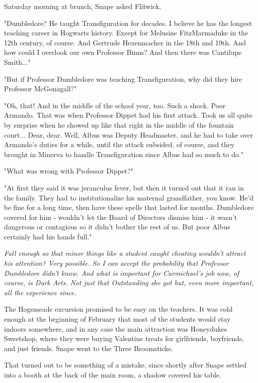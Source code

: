 \documentclass[a4paper,11pt]{article}
\begin{document}
Saturday morning at brunch, Snape asked Flitwick.

"Dumbledore? He taught Transfiguration for decades. I believe he has the longest teaching career in Hogwarts history. Except for Melusine FitzMarmaduke in the 12th century, of course. And Gertrude Hexenmacher in the 18th and 19th. And how could I overlook our own Professor Binns? And then there was Cantilupe Smith..."

"But if Professor Dumbledore was teaching Transfiguration, why did they hire Professor McGonagall?"

"Oh, that! And in the middle of the school year, too. Such a shock. Poor Armando. That was when Professor Dippet had his first attack. Took us all quite by surprise when he showed up like that right in the middle of the fountain court... Dear, dear. Well, Albus was Deputy Headmaster, and he had to take over Armando's duties for a while, until the attack subsided, of course, and they brought in Minerva to handle Transfiguration since Albus had so much to do."

"What was wrong with Professor Dippet?"

"At first they said it was jeranculus fever, but then it turned out that it ran in the family. They had to institutionalize his maternal grandfather, you know. He'd be fine for a long time, then have these spells that lasted for months. Dumbledore covered for him - wouldn't let the Board of Directors dismiss him - it wasn't dangerous or contagious so it didn't bother the rest of us. But poor Albus certainly had his hands full."

\emph{Full enough so that minor things like a student caught cheating wouldn't attract his attention? Very possible. So I can accept the probability that Professor Dumbledore didn't know. And what is important for Carmichael's job now, of course, is Dark Arts. Not just that Outstanding she got but, even more important, all the experience since.}

The Hogsmeade excursion promised to be easy on the teachers. It was cold enough at the beginning of February that most of the students would stay indoors somewhere, and in any case the main attraction was Honeydukes Sweetshop, where they were buying Valentine treats for girlfriends, boyfriends, and just friends. Snape went to the Three Broomsticks.

That turned out to be something of a mistake, since shortly after Snape settled into a booth at the back of the main room, a shadow covered his table.
\end{document}
